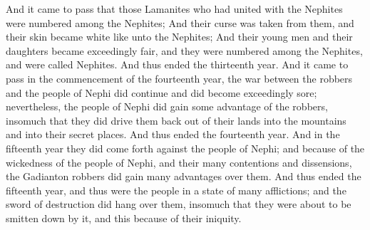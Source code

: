 \bverse \iffalse And it came to pass that those Lamanites who had united with the Nephites were numbered among the Nephites; \fi
And it came to pass that those Lamanites who had united with the Nephites were numbered among the Nephites;
\bverse \iffalse And their curse was taken from them, and their skin became white like unto the Nephites; \fi
And their curse was taken from them, and their skin became white like unto the Nephites;
\bverse \iffalse And their young men and their daughters became exceedingly fair, and they were numbered among the Nephites, and were called Nephites. And thus ended the thirteenth year. \fi
And their young men and their daughters became exceedingly fair, and they were numbered among the Nephites, and were called Nephites. And thus ended the thirteenth year.
\bverse \iffalse And it came to pass in the commencement of the fourteenth year, the war between the robbers and the people of Nephi did continue and did become exceedingly sore; nevertheless, the people of Nephi did gain some advantage of the robbers, insomuch that they did drive them back out of their lands into the mountains and into their secret places. \fi
And it came to pass in the commencement of the fourteenth year, the war between the robbers and the people of Nephi did continue and did become exceedingly sore; nevertheless, the people of Nephi did gain some advantage of the robbers, insomuch that they did drive them back out of their lands into the mountains and into their secret places.
\bverse \iffalse And thus ended the fourteenth year. And in the fifteenth year they did come forth against the people of Nephi; and because of the wickedness of the people of Nephi, and their many contentions and dissensions, the Gadianton robbers did gain many advantages over them. \fi
And thus ended the fourteenth year. And in the fifteenth year they did come forth against the people of Nephi; and because of the wickedness of the people of Nephi, and their many contentions and dissensions, the Gadianton robbers did gain many advantages over them.
\bverse \iffalse And thus ended the fifteenth year, and thus were the people in a state of many afflictions; and the sword of destruction did hang over them, insomuch that they were about to be smitten down by it, and this because of their iniquity. \fi
And thus ended the fifteenth year, and thus were the people in a state of many afflictions; and the sword of destruction did hang over them, insomuch that they were about to be smitten down by it, and this because of their iniquity.
